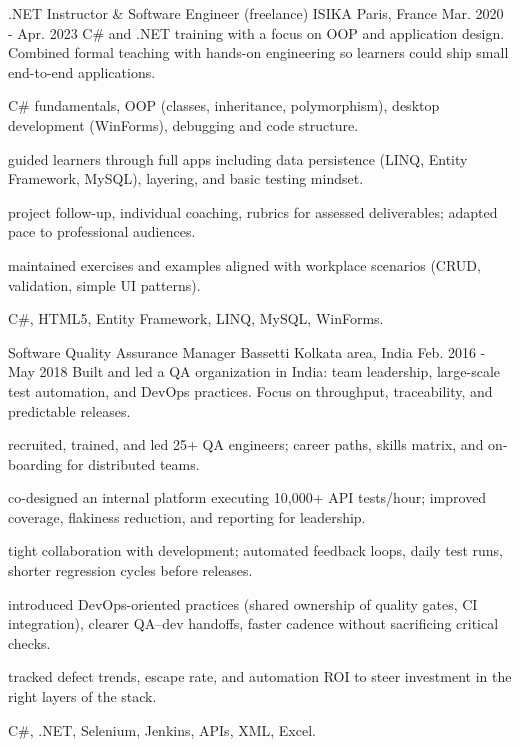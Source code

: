 \begin{cventries}
  \cventrywithintro
    {.NET Instructor \& Software Engineer (freelance)}
    {ISIKA}
    {Paris, France}
    {Mar. 2020 - Apr. 2023}
    {C\# and .NET training with a focus on OOP and application design. Combined formal teaching with hands-on engineering so learners could ship small end-to-end applications.}
    {
      \begin{cvitemsafterintro}
        \item { C\# fundamentals, OOP (classes, inheritance, polymorphism), desktop development (WinForms), debugging and code structure.}
        \item { guided learners through full apps including data persistence (LINQ, Entity Framework, MySQL), layering, and basic testing mindset.}
        \item { project follow-up, individual coaching, rubrics for assessed deliverables; adapted pace to professional audiences.}
        \item { maintained exercises and examples aligned with workplace scenarios (CRUD, validation, simple UI patterns).}
      \end{cvitemsafterintro}
    }
    {C\#, HTML5, Entity Framework, LINQ, MySQL, WinForms.}

  \cventrywithintro
    {Software Quality Assurance Manager}
    {Bassetti}
    {Kolkata area, India}
    {Feb. 2016 - May 2018}
    {Built and led a QA organization in India: team leadership, large-scale test automation, and DevOps practices. Focus on throughput, traceability, and predictable releases.}
    {
      \begin{cvitemsafterintro}
        \item { recruited, trained, and led 25+ QA engineers; career paths, skills matrix, and on-boarding for distributed teams.}
        \item { co-designed an internal platform executing 10,000+ API tests/hour; improved coverage, flakiness reduction, and reporting for leadership.}
        \item { tight collaboration with development; automated feedback loops, daily test runs, shorter regression cycles before releases.}
        \item { introduced DevOps-oriented practices (shared ownership of quality gates, CI integration), clearer QA--dev handoffs, faster cadence without sacrificing critical checks.}
        \item { tracked defect trends, escape rate, and automation ROI to steer investment in the right layers of the stack.}
      \end{cvitemsafterintro}
    }
    {C\#, .NET, Selenium, Jenkins, APIs, XML, Excel.}


\end{cventries}
